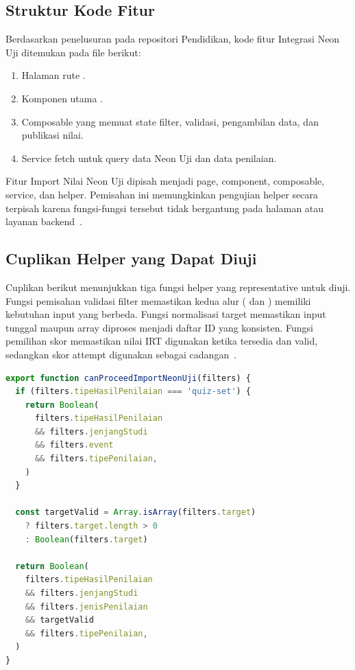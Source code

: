 \subsection{Struktur Kode Fitur}
Berdasarkan penelusuran pada repositori Pendidikan, kode fitur Integrasi Neon Uji ditemukan pada file berikut:

\begin{enumerate}
	\item Halaman rute .
	\item Komponen utama .
	\item Composable  yang memuat state filter, validasi, pengambilan data, dan publikasi nilai.
	\item Service fetch  untuk query data Neon Uji dan data penilaian.
\end{enumerate}

Fitur Import Nilai Neon Uji dipisah menjadi page, component, composable, service, dan helper. Pemisahan ini memungkinkan pengujian helper secara terpisah karena fungsi-fungsi tersebut tidak bergantung pada halaman atau layanan backend~\cite{pendidikan_useImportNeonUji_helpers,pendidikan_useImportNeonUji_test}.

\subsection{Cuplikan Helper yang Dapat Diuji}
Cuplikan berikut menunjukkan tiga fungsi helper yang representative untuk diuji. Fungsi pemisahan validasi filter memastikan kedua alur ( dan ) memiliki kebutuhan input yang berbeda. Fungsi normalisasi target memastikan input tunggal maupun array diproses menjadi daftar ID yang konsisten. Fungsi pemilihan skor memastikan nilai IRT digunakan ketika tersedia dan valid, sedangkan skor attempt digunakan sebagai cadangan~\cite{pendidikan_useImportNeonUji_helpers}.

\begin{lstlisting}[language=JavaScript, caption={Cuplikan validasi filter Import Nilai Neon Uji}, label={lst:helper_validation_import_neon_uji}]
export function canProceedImportNeonUji(filters) {
  if (filters.tipeHasilPenilaian === 'quiz-set') {
    return Boolean(
      filters.tipeHasilPenilaian
      && filters.jenjangStudi
      && filters.event
      && filters.tipePenilaian,
    )
  }

  const targetValid = Array.isArray(filters.target)
    ? filters.target.length > 0
    : Boolean(filters.target)

  return Boolean(
    filters.tipeHasilPenilaian
    && filters.jenjangStudi
    && filters.jenisPenilaian
    && targetValid
    && filters.tipePenilaian,
  )
}
\end{lstlisting}

